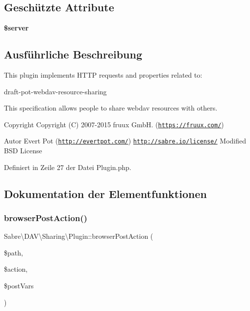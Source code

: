 \subsection*{Geschützte Attribute}
\begin{DoxyCompactItemize}
\item 
\mbox{\label{class_sabre_1_1_d_a_v_1_1_sharing_1_1_plugin_addb7fa488074a98f17a9f4c7516a1184}} 
{\bfseries \$server}
\end{DoxyCompactItemize}


\subsection{Ausführliche Beschreibung}
This plugin implements H\+T\+TP requests and properties related to\+:

draft-\/pot-\/webdav-\/resource-\/sharing

This specification allows people to share webdav resources with others.

\begin{DoxyCopyright}{Copyright}
Copyright (C) 2007-\/2015 fruux GmbH. (\href{https://fruux.com/}{\tt https\+://fruux.\+com/}) 
\end{DoxyCopyright}
\begin{DoxyAuthor}{Autor}
Evert Pot (\href{http://evertpot.com/}{\tt http\+://evertpot.\+com/})  \href{http://sabre.io/license/}{\tt http\+://sabre.\+io/license/} Modified B\+SD License 
\end{DoxyAuthor}


Definiert in Zeile 27 der Datei Plugin.\+php.



\subsection{Dokumentation der Elementfunktionen}
\mbox{\label{class_sabre_1_1_d_a_v_1_1_sharing_1_1_plugin_a1c92393af768740f55f79659d935c27f}} 
\subsubsection{\texorpdfstring{browser\+Post\+Action()}{browserPostAction()}}
{\footnotesize\ttfamily Sabre\textbackslash{}\+D\+A\+V\textbackslash{}\+Sharing\textbackslash{}\+Plugin\+::browser\+Post\+Action (\begin{DoxyParamCaption}\item[{}]{\$path,  }\item[{}]{\$action,  }\item[{}]{\$post\+Vars }\end{DoxyParamCaption})}

